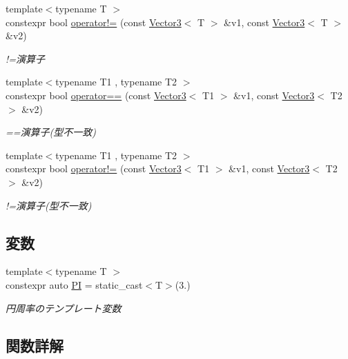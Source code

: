 \begin{DoxyCompactItemize}
{\footnotesize template$<$typename T $>$ }\\constexpr bool \mbox{\hyperlink{namespacesaki_a49b3805c2b97e135606939b8d64eca20}{operator!=}} (const \mbox{\hyperlink{classsaki_1_1_vector3}{Vector3}}$<$ T $>$ \&v1, const \mbox{\hyperlink{classsaki_1_1_vector3}{Vector3}}$<$ T $>$ \&v2)
\begin{DoxyCompactList}\small\item\em !=演算子 \end{DoxyCompactList}\item 
{\footnotesize template$<$typename T1 , typename T2 $>$ }\\constexpr bool \mbox{\hyperlink{namespacesaki_a487f0b513be6d4a0aecafeec28b6fc69}{operator==}} (const \mbox{\hyperlink{classsaki_1_1_vector3}{Vector3}}$<$ T1 $>$ \&v1, const \mbox{\hyperlink{classsaki_1_1_vector3}{Vector3}}$<$ T2 $>$ \&v2)
\begin{DoxyCompactList}\small\item\em ==演算子(型不一致) \end{DoxyCompactList}\item 
{\footnotesize template$<$typename T1 , typename T2 $>$ }\\constexpr bool \mbox{\hyperlink{namespacesaki_a26df5bd85b044f8556c4e258479b54f7}{operator!=}} (const \mbox{\hyperlink{classsaki_1_1_vector3}{Vector3}}$<$ T1 $>$ \&v1, const \mbox{\hyperlink{classsaki_1_1_vector3}{Vector3}}$<$ T2 $>$ \&v2)
\begin{DoxyCompactList}\small\item\em !=演算子(型不一致) \end{DoxyCompactList}\end{DoxyCompactItemize}
\subsection*{変数}
\begin{DoxyCompactItemize}
\item 
{\footnotesize template$<$typename T $>$ }\\constexpr auto \mbox{\hyperlink{namespacesaki_a1e4c737224df004cb65f178577838f0c}{PI}} = static\+\_\+cast$<$T$>$(3.)
\begin{DoxyCompactList}\small\item\em 円周率のテンプレート変数 \end{DoxyCompactList}\end{DoxyCompactItemize}


\subsection{関数詳解}
\mbox{\label{namespacesaki_a012046e05c5909bb34ca3e609ca74ff3}} 
